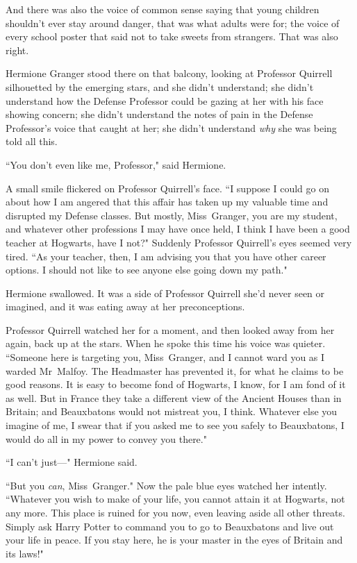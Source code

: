 And there was also the voice of common sense saying that young children shouldn't ever stay around danger, that was what adults were for; the voice of every school poster that said not to take sweets from strangers. That was also right.

Hermione Granger stood there on that balcony, looking at Professor Quirrell silhouetted by the emerging stars, and she didn't understand; she didn't understand how the Defense Professor could be gazing at her with his face showing concern; she didn't understand the notes of pain in the Defense Professor's voice that caught at her; she didn't understand \emph{why} she was being told all this.

``You don't even like me, Professor," said Hermione.

A small smile flickered on Professor Quirrell's face. ``I suppose I could go on about how I am angered that this affair has taken up my valuable time and disrupted my Defense classes. But mostly, Miss~Granger, you are my student, and whatever other professions I may have once held, I think I have been a good teacher at Hogwarts, have I not?" Suddenly Professor Quirrell's eyes seemed very tired. ``As your teacher, then, I am advising you that you have other career options. I should not like to see anyone else going down my path."

Hermione swallowed. It was a side of Professor Quirrell she'd never seen or imagined, and it was eating away at her preconceptions.

Professor Quirrell watched her for a moment, and then looked away from her again, back up at the stars. When he spoke this time his voice was quieter. ``Someone here is targeting you, Miss~Granger, and I cannot ward you as I warded Mr~Malfoy. The Headmaster has prevented it, for what he claims to be good reasons. It is easy to become fond of Hogwarts, I know, for I am fond of it as well. But in France they take a different view of the Ancient Houses than in Britain; and Beauxbatons would not mistreat you, I think. Whatever else you imagine of me, I swear that if you asked me to see you safely to Beauxbatons, I would do all in my power to convey you there."

``I can't just—" Hermione said.

``But you \emph{can}, Miss~Granger." Now the pale blue eyes watched her intently. ``Whatever you wish to make of your life, you cannot attain it at Hogwarts, not any more. This place is ruined for you now, even leaving aside all other threats. Simply ask Harry Potter to command you to go to Beauxbatons and live out your life in peace. If you stay here, he is your master in the eyes of Britain and its laws!"

